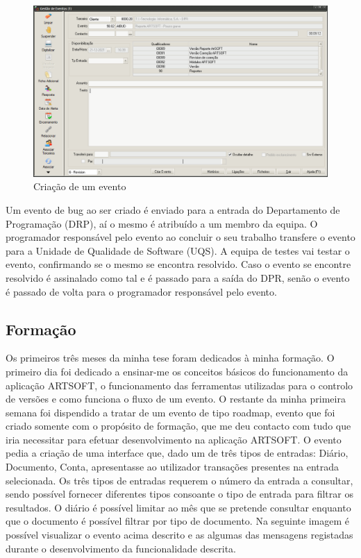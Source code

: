 \documentclass[sigplan]{acmart}
\begin{document}
\begin{figure}[htbp]
	\centerline{\includegraphics[width=\linewidth]{figures/evento_criacao.png}}
	\caption{Criação de um evento}
	\label{fig1}
\end{figure}

Um evento de bug ao ser criado é enviado para a entrada do Departamento de Programação (DRP), aí o mesmo é atribuído a um membro da equipa. O programador responsável pelo evento ao concluir o seu trabalho transfere o evento para a Unidade de Qualidade de Software (UQS). A equipa de testes vai testar o evento, confirmando se o mesmo se encontra resolvido. Caso o evento se encontre resolvido é assinalado como tal e é passado para a saída do DPR, senão o evento é passado de volta para o programador responsável pelo evento.

\subsection{Formação}

Os primeiros três meses da minha tese foram dedicados à minha formação. O primeiro dia foi dedicado a ensinar-me os conceitos básicos do funcionamento da aplicação ARTSOFT, o funcionamento das ferramentas utilizadas para o controlo de versões e como funciona o fluxo de um evento. O restante da minha primeira semana foi dispendido a tratar de um evento de tipo roadmap, evento que foi criado somente com o propósito de formação, que me deu contacto com tudo que iria necessitar para efetuar desenvolvimento na aplicação ARTSOFT. O evento pedia a criação de uma interface que, dado um de três tipos de entradas: Diário, Documento, Conta, apresentasse ao utilizador transações presentes na entrada selecionada. Os três tipos de entradas requerem o número da entrada a consultar, sendo possível fornecer diferentes tipos consoante o tipo de entrada para filtrar os resultados. O diário é possível limitar ao mês que se pretende consultar enquanto que o documento é possível filtrar por tipo de documento. Na seguinte imagem é possível visualizar o evento acima descrito e as algumas das mensagens registadas durante o desenvolvimento da funcionalidade descrita.
\end{document}
